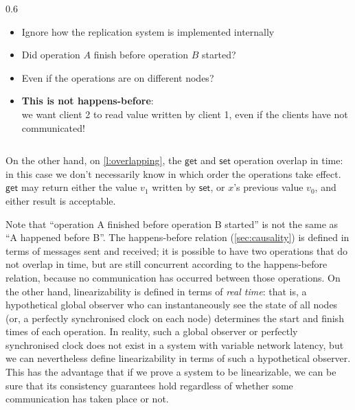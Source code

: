 \begin{frame}
\begin{columns}
\begin{column}{0.6\textwidth}
\begin{itemize}
                \item<2-> Ignore how the replication system is implemented internally
                \item<3-> Did operation $A$ finish before operation $B$ started?
                \item<4-> Even if the operations are on different nodes?
                \item<5-> \textbf{This is not happens-before}:\\
                    we want client 2 to read value written by client 1, even if the clients have not communicated!
            \end{itemize}
        \end{column}
    \end{columns}
\end{frame}
\label{l:read-after-write-3}

On the other hand, on \autoref{l:overlapping}, the $\mathsf{get}$ and $\mathsf{set}$ operation overlap in time: in this case we don't necessarily know in which order the operations take effect.
$\mathsf{get}$ may return either the value $v_1$ written by $\mathsf{set}$, or $x$'s previous value $v_0$, and either result is acceptable.

Note that ``operation A finished before operation B started'' is not the same as ``A happened before B''.
The happens-before relation (\autoref{sec:causality}) is defined in terms of messages sent and received; it is possible to have two operations that do not overlap in time, but are still concurrent according to the happens-before relation, because no communication has occurred between those operations.
On the other hand, linearizability is defined in terms of \emph{real time}: that is, a hypothetical global observer who can instantaneously see the state of all nodes (or, a perfectly synchronised clock on each node) determines the start and finish times of each operation.
In reality, such a global observer or perfectly synchronised clock does not exist in a system with variable network latency, but we can nevertheless define linearizability in terms of such a hypothetical observer.
This has the advantage that if we prove a system to be linearizable, we can be sure that its consistency guarantees hold regardless of whether some communication has taken place or not.

